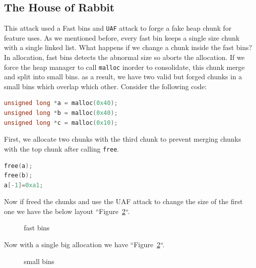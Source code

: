 \documentclass{masterthesis}
\newcommand*\fb{fast bins}
\newcommand*\sbs{small bins}
\newcommand*\Fb{Fast bins\xspace}
\newcommand*\mallocc{\lstinline{malloc}}
\begin{document}
\subsection{The House of Rabbit}

This attack used a \Fb{} and \lstinline{UAF} attack to forge a fake heap chunk for feature uses. As we mentioned before, every fast bin keeps a single size chunk with a single linked list. What happens if we change a chunk inside the \fb{}? In allocation, \fb{} detects the abnormal size so aborts the allocation. If we force the heap manager to call \mallocc{} inorder to consolidate, this chunk merge and split into \sbs{}. as a result, we have two valid but forged chunks in a \sbs{} which overlap which other. Consider the following code:

\begin{lstlisting}[language=c,frame=tlrb]
unsigned long *a = malloc(0x40);
unsigned long *b = malloc(0x40);
unsigned long *c = malloc(0x10);
\end{lstlisting}

First, we allocate two chunks with the third chunk to prevent merging chunks with the top chunk after calling \lstinline{free}.

\begin{lstlisting}[language=c,frame=tlrb]
free(a);
free(b);
a[-1]=0xa1;
\end{lstlisting}

Now if freed the chunks and use the UAF attack to change the size of the first one we have the below layout ``Figure~\ref{fig:gdb9}``.

\begin{figure}[h!]
 \caption{\fb{}}
  \label{fig:gdb8}
\end{figure}

Now with a single big allocation we have ``Figure~\ref{fig:gdb9}``.
\begin{figure}[h!]
 \caption{\sbs{}}
  \label{fig:gdb9}
\end{figure}
\end{document}
